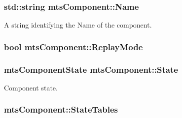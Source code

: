 \subsubsection[{Name}]{\setlength{\rightskip}{0pt plus 5cm}std\+::string mts\+Component\+::\+Name\hspace{0.3cm}{\ttfamily [protected]}}\label{classmts_component_a506cd73bf8afc8286ddf8d933b1b1658}
A string identifying the \textquotesingle{}Name\textquotesingle{} of the component. \hypertarget{classmts_component_a1415d1093295a997b52d7c9d026fb5cc}{}
\subsubsection[{Replay\+Mode}]{\setlength{\rightskip}{0pt plus 5cm}bool mts\+Component\+::\+Replay\+Mode\hspace{0.3cm}{\ttfamily [protected]}}\label{classmts_component_a1415d1093295a997b52d7c9d026fb5cc}
\hypertarget{classmts_component_ac5352257c71985bc22cfa81e87f7f445}{}
\subsubsection[{State}]{\setlength{\rightskip}{0pt plus 5cm}mts\+Component\+State mts\+Component\+::\+State\hspace{0.3cm}{\ttfamily [protected]}}\label{classmts_component_ac5352257c71985bc22cfa81e87f7f445}
Component state. \hypertarget{classmts_component_abe07b3be754d3f14a8454b21f160b537}{}
\subsubsection[{State\+Tables}]{ mts\+Component\+::\+State\+Tables\hspace{0.3cm}{\ttfamily [protected]}}\label{classmts_component_abe07b3be754d3f14a8454b21f160b537}
\hypertarget{classmts_component_a12390c92b351b911b723158e636a9e5a}{}
